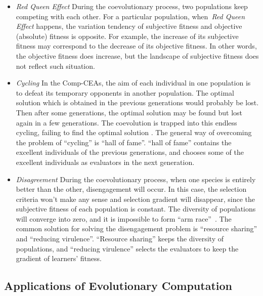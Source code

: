 \begin{itemize}
\item \textit{Red Queen Effect} During the coevolutionary process, two populations keep competing with each other. For a particular population, when~\textit{Red Queen Effect} happens, the variation tendency of subjective fitness and objective (absolute) fitness is opposite. For example, the increase of its subjective fitness may correspond to the decrease of its objective fitness. In other words, the objective fitness does increase, but the landscape of subjective fitness does not reflect such situation. 

\item \textit{Cycling} In the Comp-CEAs, the aim of each individual in one population is to defeat its temporary opponents in another population. The optimal solution which is obtained in the previous generations would probably be lost. Then after some generations, the optimal solution may be found but lost again in a few generations. The coevolution is trapped into this endless cycling, failing to find the optimal solution \cite{John_2004}. The general way of overcoming the problem of ``cycling'' is ``hall of fame''\cite{Rosin_1997}. ``hall of fame'' contains the excellent individuals of the previous generations, and chooses some of the excellent individuals as evaluators in the next generation.

\item \textit{Disagreement} During the coevolutionary process, when one species is entirely better than the other, disengagement will occur. In this case, the selection criteria won't make any sense and selection gradient will disappear, since the subjective fitness of each population is constant. The diversity of populations will converge into zero, and it is impossible to form ``arm race''~\cite{Dawkins_1979}. The common solution for solving the disengagement problem is ``resource sharing'' and ``reducing virulence''\cite{John_2004}. ``Resource sharing'' keeps the diversity of populations, and ``reducing virulence'' selects the evaluators to keep the gradient of learners' fitness.

\end{itemize}

\subsection{Applications of Evolutionary Computation}\label{sec:application_evolutionary_computation}

